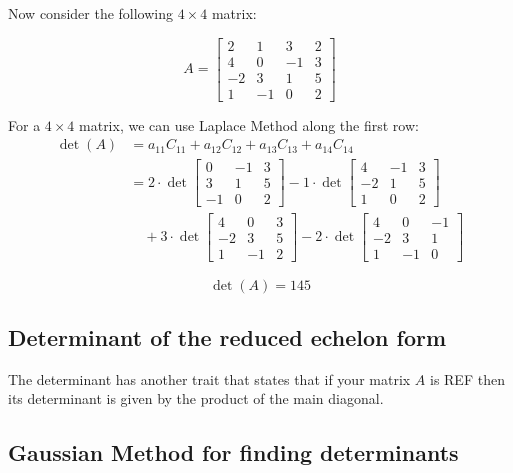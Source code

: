  Now consider the following \(4 \times 4\) matrix:

\begin{equation*}
A = 
\begin{bmatrix}
2 & 1 & 3 & 2 \\
4 & 0 & -1 & 3 \\
-2 & 3 & 1 & 5 \\
1 & -1 & 0 & 2
\end{bmatrix}
\end{equation*}

For a \(4 \times 4\) matrix, we can use Laplace Method along the first row:
\begin{align*}
\det(A) &= a_{11}C_{11} + a_{12}C_{12} + a_{13}C_{13} + a_{14}C_{14} \\
&= 2 \cdot \det\begin{bmatrix} 0 & -1 & 3 \\ 3 & 1 & 5 \\ -1 & 0 & 2 \end{bmatrix} 
- 1 \cdot \det\begin{bmatrix} 4 & -1 & 3 \\ -2 & 1 & 5 \\ 1 & 0 & 2 \end{bmatrix} \\
&\quad + 3 \cdot \det\begin{bmatrix} 4 & 0 & 3 \\ -2 & 3 & 5 \\ 1 & -1 & 2 \end{bmatrix} 
- 2 \cdot \det\begin{bmatrix} 4 & 0 & -1 \\ -2 & 3 & 1 \\ 1 & -1 & 0 \end{bmatrix}
\end{align*}

\[\det(A) = 145\]

\subsection{Determinant of the reduced echelon form}

The determinant has another trait that states that if your matrix \(A\) is REF then
its determinant is given by the product of the main diagonal. 

\subsection{Gaussian Method for finding determinants}

